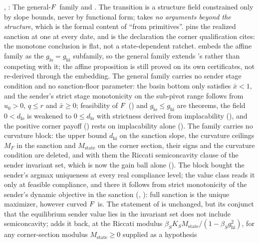 \begin{itemize}[leftmargin=1.4em,itemsep=1pt]
, : The
general-$F$ family and . The transition
is a structure field constrained only by slope bounds, never by functional
form;  takes \emph{no arguments beyond the
structure}, which is the formal content of ``from primitives''.
 pins the realized sanction at one at
every date, and is the declaration the corner qualification cites: the
monotone conclusion is flat, not a state-dependent ratchet.
 embeds the affine family as the
$g_{\mathrm{lo}}=g_{\mathrm{hi}}$ subfamily, so the general family
extends 's rather than competing with it;
the affine proposition is still proved on its own certificates, not
re-derived through the embedding. The
general family carries no sender stage condition and no sanction-floor
parameter: the basin bottom only satisfies $\bar x<1$, and the sender's strict
stage monotonicity on the sub-pivot range follows from $u_0>0$, $q\le r$ and
$\bar x\ge0$; feasibility of $F$ () and
$g_{\mathrm{lo}}\le g_{\mathrm{hi}}$ are theorems, the field $0<d_{\mathrm{lo}}$
is weakened to $0\le d_{\mathrm{lo}}$ with strictness derived from implacability
(), and the positive corner payoff ()
rests on implacability alone (). The family
carries no curvature block: the upper
bound $d_{\mathrm{hi}}$ on the sanction slope, the curvature ceilings $M_F$ in the sanction
and $M_{\mathrm{state}}$ on the corner section, their signs and the curvature
condition are deleted, and with them the Riccati semiconcavity clause of the sender
invariant set, which is now the gain ball alone ().
The block bought the sender's argmax uniqueness at every real compliance level;
the value class reads it only at feasible compliance, and there it follows from
strict monotonicity of the sender's dynamic objective in the sanction
(, ): full
sanction is the unique maximizer, however curved $F$ is. The statement of
 is unchanged, but its conjunct that
the equilibrium sender value lies in the invariant set does not include
semiconcavity;  adds it back, at the
Riccati modulus $\beta_SK_SM_{\mathrm{state}}/(1-\beta_Sg_{\mathrm{hi}}^2)$,
for any corner-section modulus $M_{\mathrm{state}}\ge0$ supplied as a hypothesis

\end{itemize}

